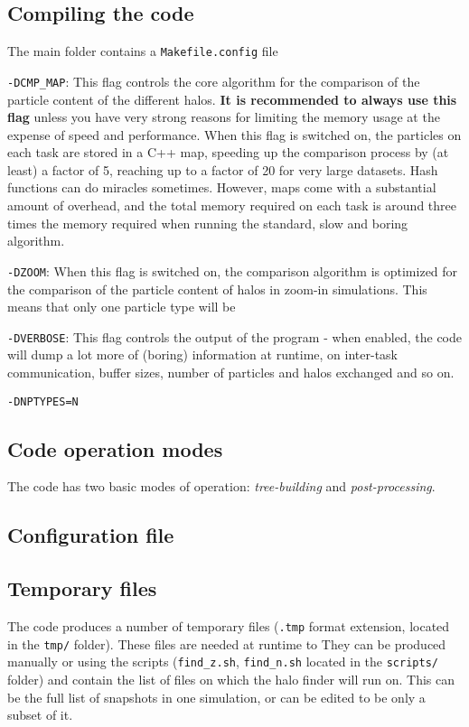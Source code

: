 \documentclass{article}
\begin{document}
\subsection{Compiling the code}

The main folder contains a \texttt{Makefile.config} file 

\noindent
\texttt{-DCMP\_MAP}: This flag controls the core algorithm for the comparison of the particle content of the different halos.
\textbf{It is recommended to always use this flag} unless you have very strong reasons for limiting the memory usage at the 
expense of speed and performance. 
When this flag is switched on, the particles on each task are stored in a C++ map, 
speeding up the comparison process by (at least) a factor of 5, reaching up to a factor of
20 for very large datasets. Hash functions can do miracles sometimes. 
However, maps come with a substantial amount of overhead, and the total memory required on each task is around three times the 
memory required when running the standard, slow and boring algorithm.

\noindent
\texttt{-DZOOM}: When this flag is switched on, the comparison algorithm is optimized for the comparison of the 
particle content of halos in zoom-in simulations. This means that only one particle type will be

\noindent
\texttt{-DVERBOSE}: This flag controls the output of the program - when enabled, the code will dump a lot more of 
(boring) information at runtime, on inter-task communication, buffer sizes, number of particles and halos exchanged and so on.

\noindent
\texttt{-DNPTYPES=N}

\subsection{Code operation modes}

The code has two basic modes of operation: \emph{tree-building} and \emph{post-processing}.

\subsection{Configuration file}

\subsection{Temporary files}

The code produces a number of temporary files (\texttt{.tmp} format extension, located in the \texttt{tmp/} folder).
These files are needed at runtime to 
They can be produced manually or using the scripts (\texttt{find\_z.sh}, \texttt{find\_n.sh} located in the \texttt{scripts/} folder)
and contain the list of files on which the halo finder will run on.
This can be the full list of snapshots in one simulation, or can be edited to be only a subset of it.
\end{document}

